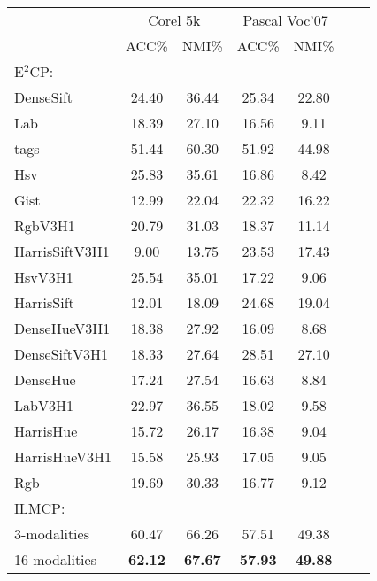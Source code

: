 \begin{table}[t]
    \centering
    \setlength{\tabcolsep}{15pt}
    \begin{tabular}{lcccccc}
        \toprule
        &\multicolumn{2}{c}{Corel 5k} & \multicolumn{2}{c}{Pascal Voc'07} \\
        \cmidrule(lr){2-3}
        \cmidrule(lr){4-5}
        & ACC\% & NMI\% & ACC\% & NMI\% \\
        \midrule
        E$^2$CP\cite{lu2010constrained}: &&&&\\
        DenseSift & 24.40 & 36.44 & 25.34 & 22.80 \\ 
        Lab & 18.39 & 27.10 & 16.56 & 9.11 \\ 
        tags & 51.44 & 60.30 & 51.92 & 44.98 \\ 
        Hsv & 25.83 & 35.61 & 16.86 & 8.42 \\ 
        Gist & 12.99 & 22.04 & 22.32 & 16.22 \\ 
        RgbV3H1 & 20.79 & 31.03 & 18.37 & 11.14 \\ 
        HarrisSiftV3H1 & 9.00 & 13.75 & 23.53 & 17.43 \\ 
        HsvV3H1 & 25.54 & 35.01 & 17.22 & 9.06 \\ 
        HarrisSift & 12.01 & 18.09 & 24.68 & 19.04 \\ 
        DenseHueV3H1 & 18.38 & 27.92 & 16.09 & 8.68 \\ 
        DenseSiftV3H1 & 18.33 & 27.64 & 28.51 & 27.10 \\ 
        DenseHue & 17.24 & 27.54 & 16.63 & 8.84 \\ 
        LabV3H1 & 22.97 & 36.55 & 18.02 & 9.58 \\ 
        HarrisHue & 15.72 & 26.17 & 16.38 & 9.04 \\ 
        HarrisHueV3H1 & 15.58 & 25.93 & 17.05 & 9.05 \\ 
        Rgb & 19.69 & 30.33 & 16.77 & 9.12 \\ 
        \midrule
        ILMCP: &&&&\\
        3-modalities         & {60.47} & {66.26}  & {57.51} & {49.38} \\ 
        16-modalities         &\textbf{62.12} &\textbf{ 67.67}   & \textbf{57.93} & \textbf{49.88}   \\	
        \bottomrule
    \end{tabular}
    \label{tab4:e2cp}
\end{table}

